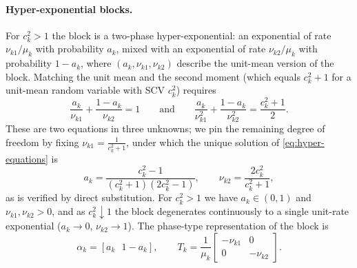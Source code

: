 \documentclass{article}
\begin{document}
\paragraph{Hyper-exponential blocks.} For $c_k^2 > 1$ the block is a two-phase hyper-exponential: an exponential of rate $\nu_{k1}/\mu_k$ with probability $a_k$, mixed with an exponential of rate $\nu_{k2}/\mu_k$ with probability $1-a_k$, where $(a_k, \nu_{k1}, \nu_{k2})$ describe the unit-mean version of the block. Matching the unit mean and the second moment (which equals $c_k^2+1$ for a unit-mean random variable with SCV $c_k^2$) requires
\begin{equation}
\label{eq:hyper-equations}
\frac{a_{k}}{\nu_{k1}}+\frac{1-a_{k}}{\nu_{k2}} = 1
\qquad\text{and}\qquad
\frac{a_{k}}{\nu_{k1}^2}+\frac{1-a_{k}}{\nu_{k2}^2} = \frac{c_{k}^2+1}{2}.
\end{equation}
These are two equations in three unknowns; we pin the remaining degree of freedom by fixing $\nu_{k1} = \frac{1}{c_k^2+1}$, under which the unique solution of \eqref{eq:hyper-equations} is
\begin{equation}
\label{eq:hyper-solution}
a_{k} = \frac{c^2_{k}-1}{(c_{k}^2+1)(2c_{k}^2-1)},
\qquad
\nu_{k2} =  \frac{2c_{k}^2}{c_{k}^2+1},
\end{equation}
as is verified by direct substitution. For $c_k^2 > 1$ we have $a_k \in (0,1)$ and $\nu_{k1},\nu_{k2} > 0$, and as $c_k^2 \downarrow 1$ the block degenerates continuously to a single unit-rate exponential ($a_k \to 0$, $\nu_{k2} \to 1$). The phase-type representation of the block is
\[
\alpha_{k} = [a_{k}~~~1-a_{k}],
\qquad
T_{k} =
\frac{1}{\mu_{k}}
\begin{bmatrix}
-\nu_{k1} & 0 \\
0 & -\nu_{k2}
\end{bmatrix}.
\]
\end{document}
